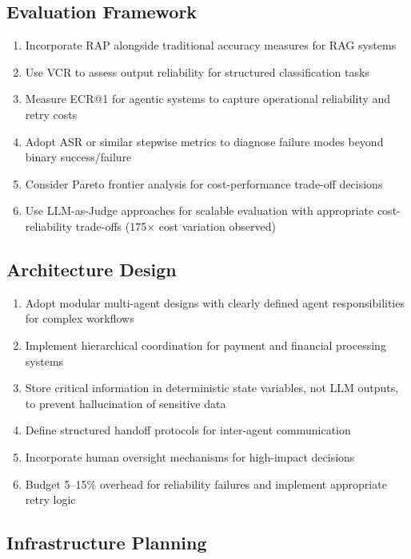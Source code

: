 \subsection{Evaluation Framework}

\begin{enumerate}[leftmargin=*]
    \item Incorporate RAP alongside traditional accuracy measures for RAG systems
    \item Use VCR to assess output reliability for structured classification tasks
    \item Measure ECR@1 for agentic systems to capture operational reliability and retry costs
    \item Adopt ASR or similar stepwise metrics to diagnose failure modes beyond binary success/failure
    \item Consider Pareto frontier analysis for cost-performance trade-off decisions
    \item Use LLM-as-Judge approaches for scalable evaluation with appropriate cost-reliability trade-offs (175$\times$ cost variation observed)
\end{enumerate}

\subsection{Architecture Design}

\begin{enumerate}[leftmargin=*]
    \item Adopt modular multi-agent designs with clearly defined agent responsibilities for complex workflows
    \item Implement hierarchical coordination for payment and financial processing systems
    \item Store critical information in deterministic state variables, not LLM outputs, to prevent hallucination of sensitive data
    \item Define structured handoff protocols for inter-agent communication
    \item Incorporate human oversight mechanisms for high-impact decisions
    \item Budget 5--15\% overhead for reliability failures and implement appropriate retry logic
\end{enumerate}

\subsection{Infrastructure Planning}

